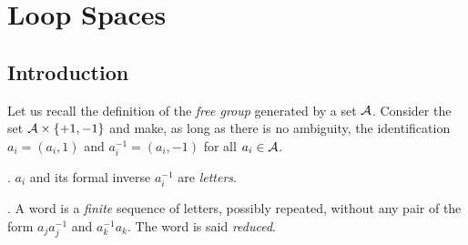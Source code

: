 \chapter{Loop Spaces}

\section{Introduction}

Let us recall the definition of the  {\em free group} generated by a set ${\cal A}$. 
Consider the set ${\cal A}\times \lbrace +1, -1 \rbrace$ and
make, as long as there is no ambiguity, the identification $a_i= (a_i,1)$ and $a_i^{-1}= (a_i,-1)$ 
for all $a_i\in{\cal A}$.

.  $a_i$ and its formal inverse $a_i^{-1}$ are  {\em letters}.

. A word is a {\em finite} sequence of letters, possibly repeated,
without any pair of the form $a_ja_j^{-1}$ and $a_k^{-1}a_k$. The word is said {\em reduced}.

